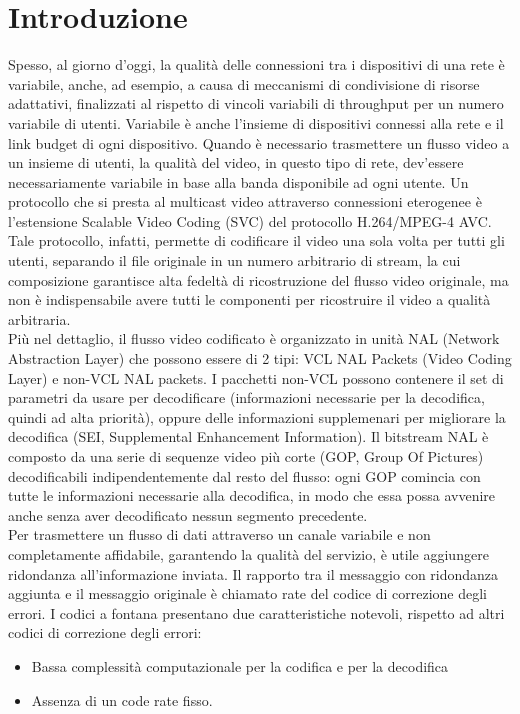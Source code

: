 \documentclass[italian, a4paper, 12pt]{article}
\begin{document}
\section{Introduzione}
Spesso, al giorno d'oggi, la qualità delle connessioni tra i dispositivi di una rete è variabile, anche, ad esempio, a causa di meccanismi di condivisione di risorse adattativi, finalizzati al rispetto di vincoli variabili di throughput per un numero variabile di utenti. Variabile è anche l'insieme di dispositivi connessi alla rete e il link budget di ogni dispositivo. Quando è necessario trasmettere un flusso video a un insieme di utenti, la qualità del video, in questo tipo di rete, dev'essere necessariamente variabile in base alla banda disponibile ad ogni utente. Un protocollo che si presta al multicast video attraverso connessioni eterogenee è l'estensione Scalable Video Coding (SVC) del protocollo H.264/MPEG-4 AVC. Tale protocollo, infatti, permette di codificare il video una sola volta per tutti gli utenti, separando il file originale in un numero arbitrario di stream, la cui composizione garantisce alta fedeltà di ricostruzione del flusso video originale, ma non è indispensabile avere tutti le componenti per ricostruire il video a qualità arbitraria.\\
Più nel dettaglio, il flusso video codificato è organizzato in unità NAL (Network Abstraction Layer) che possono essere di 2 tipi: VCL NAL Packets (Video Coding Layer) e non-VCL NAL packets. I pacchetti non-VCL possono contenere il set di parametri da usare per decodificare (informazioni necessarie per la decodifica, quindi ad alta priorità), oppure delle informazioni supplemenari per migliorare la decodifica (SEI, Supplemental Enhancement Information). Il bitstream NAL è composto da una serie di sequenze video più corte (GOP, Group Of Pictures) decodificabili indipendentemente dal resto del flusso: ogni GOP comincia con tutte le informazioni necessarie alla decodifica, in modo che essa possa avvenire anche senza aver decodificato nessun segmento precedente.\\
Per trasmettere un flusso di dati attraverso un canale variabile e non completamente affidabile, garantendo la qualità del servizio, è utile aggiungere ridondanza all'informazione inviata. Il rapporto tra il messaggio con ridondanza aggiunta e il messaggio originale è chiamato rate del codice di correzione degli errori.
I codici a fontana presentano due caratteristiche notevoli, rispetto ad altri codici di correzione degli errori:
\begin{itemize}
\item Bassa complessità computazionale per la codifica e per la decodifica
\item Assenza di un code rate fisso.
\end{itemize}
\end{document}
